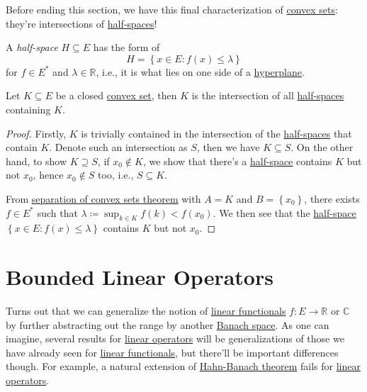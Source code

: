 Before ending this section, we have this final characterization of \hyperref[def:convex-set]{convex sets}: they're intersections of \hyperref[def:half-space]{half-spaces}!

\begin{definition}\label{def:half-space}
	A \emph{half-space} \(H \subseteq E\) has the form of
	\[
		H = \left\{ x\in E\colon f(x) \leq \lambda  \right\}
	\]
	for \(f\in E^{\ast} \) and \(\lambda \in \mathbb{R} \), i.e., it is what lies on one side of a \hyperref[def:hyperplane]{hyperplane}.
\end{definition}

\begin{corollary}\label{col:lec10}
	Let \(K\subseteq E\) be a closed \hyperref[def:convex-set]{convex set}, then \(K\) is the intersection of all \hyperref[def:half-space]{half-spaces} containing \(K\).
\end{corollary}
\begin{proof}
	Firstly, \(K\) is trivially contained in the intersection of the \hyperref[def:half-space]{half-spaces} that contain \(K\). Denote such an intersection as \(S\), then we have \(K \subseteq S\). On the other hand, to show \(K \supseteq S\), if \(x_0 \notin K\), we show that there's a \hyperref[def:half-space]{half-space} contains \(K\) but not \(x_0\), hence \(x_0 \notin S\) too, i.e., \(S \subseteq K\).

	From \hyperref[thm:separation-of-convex-sets]{separation of convex sets theorem} with \(A = K\) and \(B = \left\{ x_0 \right\}\), there exists \(f\in E^{\ast} \) such that \(\lambda \coloneqq \sup _{k\in K}f(k) < f(x_0)\). We then see that the \hyperref[def:half-space]{half-space} \(\left\{ x\in E \colon f(x) \leq \lambda  \right\} \) contains \(K\) but not \(x_0\).
\end{proof}

\section{Bounded Linear Operators}
Turns out that we can generalize the notion of \hyperref[def:linear-functional]{linear functionals} \(f\colon E\to \mathbb{R} \) or \(\mathbb{C} \) by further abstracting out the range by another \hyperref[def:Banach-space]{Banach space}. As one can imagine, several results for \hyperref[def:linear-op]{linear operators} will be generalizations of those we have already seen for \hyperref[def:linear-functional]{linear functionals}, but there'll be important differences though. For example, a natural extension of \hyperref[thm:Hahn-Banach]{Hahn-Banach theorem} fails for \hyperref[def:linear-op]{linear operators}.

